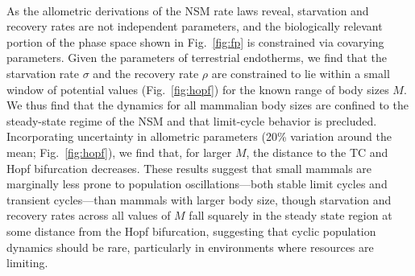\documentclass{pnastwo}
\begin{document}
\begin{article}
 \\
As the allometric derivations of the NSM rate laws reveal, starvation and recovery rates are not independent parameters, and the biologically relevant portion of the phase space shown in Fig.~\ref{fig:fp} is constrained via covarying parameters.
Given the parameters of terrestrial endotherms, we find that the starvation rate $\sigma$ and the recovery rate $\rho$ are constrained to lie within a small window of potential values (Fig.~\ref{fig:hopf}) for the known range of body sizes $M$.
We thus find that the dynamics for all mammalian body sizes are confined to the steady-state regime of the NSM and that limit-cycle behavior is precluded.
Incorporating uncertainty in allometric parameters (20\% variation around the mean; Fig.~\ref{fig:hopf}), we find that, for larger $M$, the distance to the TC and Hopf bifurcation decreases.
These results suggest that small mammals are marginally less prone to population oscillations---both stable limit cycles and transient cycles---than mammals with larger body size, though starvation and recovery rates across all values of $M$ fall squarely in the steady state region at some distance from the Hopf bifurcation, suggesting that cyclic population dynamics should be rare, particularly in environments where resources are limiting.


\end{article}
\end{document}
